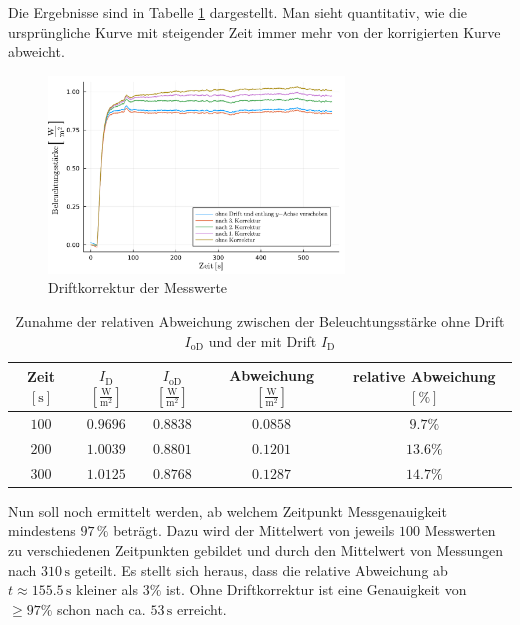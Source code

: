 \documentclass[12pt,a4paper]{scrartcl}
\numberwithin{equation}{section} %
\begin{document}
Die Ergebnisse sind in Tabelle \ref{tab:rel Abweichung} dargestellt. Man sieht quantitativ, wie die ursprüngliche Kurve mit steigender Zeit immer mehr von der korrigierten Kurve abweicht.

\begin{figure}[h!]
  \centering
  \includegraphics[width=0.7\textwidth]{../media/B1.1/Drift.pdf}
  \caption{Driftkorrektur der Messwerte}
  \label{abb:Driftkorrektur der Messwerte}
\end{figure}

\begin{table}[h!]
  \centering
  \begin{tabular}{c|c|c|c|c}
    Zeit $[\mathrm{s}]$
    & $I_\mathrm{D}$ $[\mathrm{\frac{W}{m^2}}]$
    & $I_\mathrm{oD}$ $[\mathrm{\frac{W}{m^2}}]$
    & Abweichung $[\mathrm{\frac{W}{m^2}}]$
    & relative Abweichung $[\%]$ \\
    \hline
    $100$ & $0.9696$ & $0.8838$ & $0.0858$ & $9.7\%$\\
    $200$ & $1.0039$ & $0.8801$ & $0.1201$ & $13.6\%$\\
    $300$ & $1.0125$ & $0.8768$ & $0.1287$ & $14.7\%$\\
  \end{tabular}
  \caption{Zunahme der relativen Abweichung zwischen der Beleuchtungsstärke ohne Drift $I_\mathrm{oD}$ und der mit Drift $I_\mathrm{D}$}
  \label{tab:rel Abweichung}
\end{table}

Nun soll noch ermittelt werden, ab welchem Zeitpunkt Messgenauigkeit mindestens $97\,\%$ beträgt. Dazu wird der Mittelwert von jeweils $100$ Messwerten zu verschiedenen Zeitpunkten gebildet und durch den Mittelwert von Messungen nach $310\mathrm{\,s}$ geteilt. Es stellt sich heraus, dass die relative Abweichung ab $t \approx 155.5\mathrm{\,s}$ kleiner als $3\%$ ist. Ohne Driftkorrektur ist eine Genauigkeit von $\geq 97\%$ schon nach ca. $53\mathrm{\,s}$ erreicht.
\end{document}
